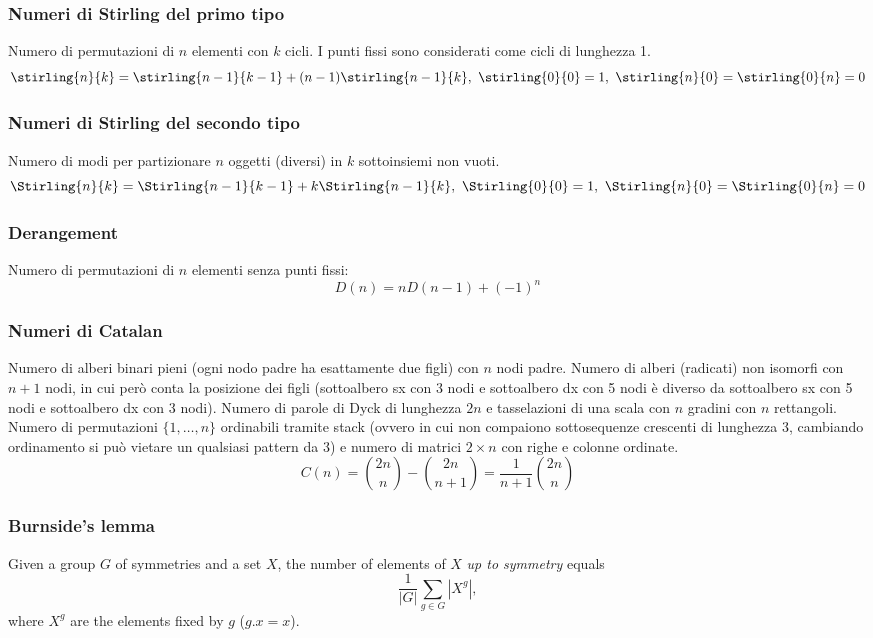 \subsubsection{Numeri di Stirling del primo tipo}
Numero di permutazioni di $n$ elementi con $k$ cicli. I punti fissi sono considerati come cicli di lunghezza 1.
$$ \stirling{n}{k} = \stirling{n-1}{k-1} + (n-1)\stirling{n-1}{k}, \ \stirling{0}{0}=1, \ \stirling{n}{0}=\stirling{0}{n}=0$$

\subsubsection{Numeri di Stirling del secondo tipo}
Numero di modi per partizionare $n$ oggetti (diversi) in $k$ sottoinsiemi non vuoti.
$$ \Stirling{n}{k} = \Stirling{n-1}{k-1} + k\Stirling{n-1}{k}, \ \Stirling{0}{0}=1,\ \Stirling{n}{0}=\Stirling{0}{n}=0 $$

\subsubsection{Derangement}
Numero di permutazioni di $n$ elementi senza punti fissi: $$ D(n)=nD(n-1)+(-1)^n $$

\subsubsection{Numeri di Catalan}
Numero di alberi binari pieni (ogni nodo padre ha esattamente due figli) con $n$ nodi padre.
Numero di alberi (radicati) non isomorfi con $n+1$ nodi, in cui però conta la posizione dei figli (sottoalbero sx con 3 nodi e sottoalbero dx con 5 nodi è diverso da sottoalbero sx con 5 nodi e sottoalbero dx con 3 nodi).
Numero di parole di Dyck di lunghezza $2n$ e tasselazioni di una scala con $n$ gradini con $n$ rettangoli.
Numero di permutazioni $\{1,\dots,n\}$ ordinabili tramite stack (ovvero in cui non compaiono sottosequenze crescenti di lunghezza 3, cambiando ordinamento si può vietare un qualsiasi pattern da 3) e numero di matrici $2\times n$ con righe e colonne ordinate.
$$ C(n)=\binom{2n}{n}-\binom{2n}{n+1}=\frac{1}{n+1}\binom{2n}{n} $$

\subsubsection{Burnside's lemma}
		Given a group $G$ of symmetries and a set $X$, the number of elements of $X$ \emph{up to symmetry} equals
		 \[ {\frac {1}{|G|}}\sum _{{g\in G}}|X^{g}|, \]
		 where $X^{g}$ are the elements fixed by $g$ ($g.x = x$).

